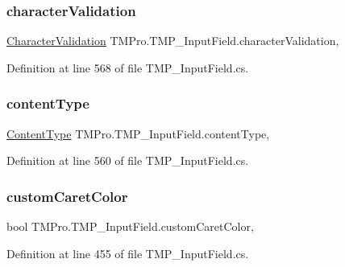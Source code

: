 \subsubsection{\texorpdfstring{characterValidation}{characterValidation}}
{\footnotesize\ttfamily \mbox{\hyperlink{class_t_m_pro_1_1_t_m_p___input_field_a96ac8b8cc04492aadbf24839b8d6376e}{Character\+Validation}} T\+M\+Pro.\+T\+M\+P\+\_\+\+Input\+Field.\+character\+Validation\hspace{0.3cm}{\ttfamily [get]}, {\ttfamily [set]}}



Definition at line 568 of file T\+M\+P\+\_\+\+Input\+Field.\+cs.

\mbox{\label{class_t_m_pro_1_1_t_m_p___input_field_af72fd8ccfa126c4a684801ea3de9b93c}} 
\subsubsection{\texorpdfstring{contentType}{contentType}}
{\footnotesize\ttfamily \mbox{\hyperlink{class_t_m_pro_1_1_t_m_p___input_field_a30e2af425a58881d8b71361e70ddbe27}{Content\+Type}} T\+M\+Pro.\+T\+M\+P\+\_\+\+Input\+Field.\+content\+Type\hspace{0.3cm}{\ttfamily [get]}, {\ttfamily [set]}}



Definition at line 560 of file T\+M\+P\+\_\+\+Input\+Field.\+cs.

\mbox{\label{class_t_m_pro_1_1_t_m_p___input_field_ae95089918945d8b6cc2b669d4de7fb23}} 
\subsubsection{\texorpdfstring{customCaretColor}{customCaretColor}}
{\footnotesize\ttfamily bool T\+M\+Pro.\+T\+M\+P\+\_\+\+Input\+Field.\+custom\+Caret\+Color\hspace{0.3cm}{\ttfamily [get]}, {\ttfamily [set]}}



Definition at line 455 of file T\+M\+P\+\_\+\+Input\+Field.\+cs.

